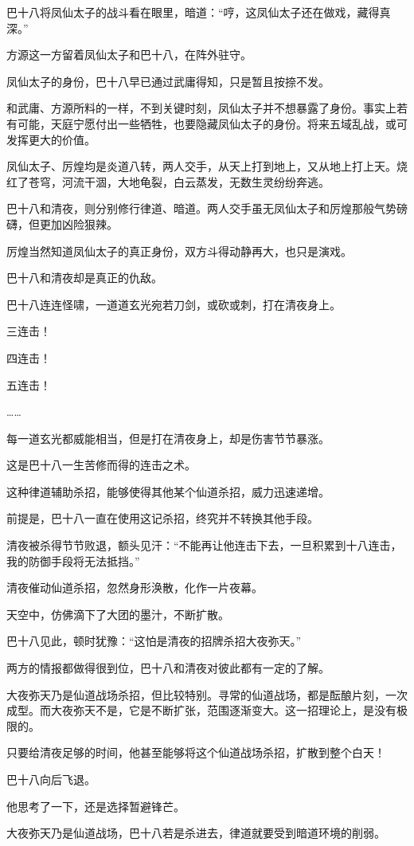 \begin{this_body}
巴十八将凤仙太子的战斗看在眼里，暗道：“哼，这凤仙太子还在做戏，藏得真深。”

方源这一方留着凤仙太子和巴十八，在阵外驻守。

凤仙太子的身份，巴十八早已通过武庸得知，只是暂且按捺不发。

和武庸、方源所料的一样，不到关键时刻，凤仙太子并不想暴露了身份。事实上若有可能，天庭宁愿付出一些牺牲，也要隐藏凤仙太子的身份。将来五域乱战，或可发挥更大的价值。

凤仙太子、厉煌均是炎道八转，两人交手，从天上打到地上，又从地上打上天。烧红了苍穹，河流干涸，大地龟裂，白云蒸发，无数生灵纷纷奔逃。

巴十八和清夜，则分别修行律道、暗道。两人交手虽无凤仙太子和厉煌那般气势磅礴，但更加凶险狠辣。

厉煌当然知道凤仙太子的真正身份，双方斗得动静再大，也只是演戏。

巴十八和清夜却是真正的仇敌。

巴十八连连怪啸，一道道玄光宛若刀剑，或砍或刺，打在清夜身上。

三连击！

四连击！

五连击！

……

每一道玄光都威能相当，但是打在清夜身上，却是伤害节节暴涨。

这是巴十八一生苦修而得的连击之术。

这种律道辅助杀招，能够使得其他某个仙道杀招，威力迅速递增。

前提是，巴十八一直在使用这记杀招，终究并不转换其他手段。

清夜被杀得节节败退，额头见汗：“不能再让他连击下去，一旦积累到十八连击，我的防御手段将无法抵挡。”

清夜催动仙道杀招，忽然身形涣散，化作一片夜幕。

天空中，仿佛滴下了大团的墨汁，不断扩散。

巴十八见此，顿时犹豫：“这怕是清夜的招牌杀招大夜弥天。”

两方的情报都做得很到位，巴十八和清夜对彼此都有一定的了解。

大夜弥天乃是仙道战场杀招，但比较特别。寻常的仙道战场，都是酝酿片刻，一次成型。而大夜弥天不是，它是不断扩张，范围逐渐变大。这一招理论上，是没有极限的。

只要给清夜足够的时间，他甚至能够将这个仙道战场杀招，扩散到整个白天！

巴十八向后飞退。

他思考了一下，还是选择暂避锋芒。

大夜弥天乃是仙道战场，巴十八若是杀进去，律道就要受到暗道环境的削弱。


\end{this_body}
